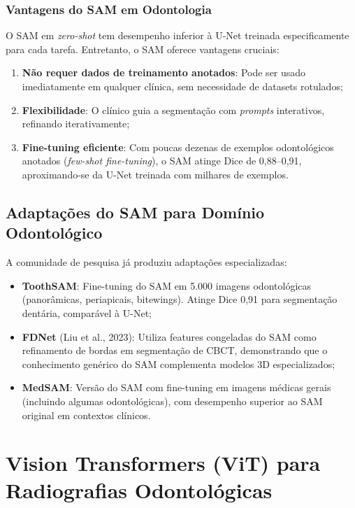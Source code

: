 \subsubsection{Vantagens do SAM em Odontologia}

O SAM em \textit{zero-shot} tem desempenho inferior à U-Net treinada especificamente para cada tarefa. Entretanto, o SAM oferece vantagens cruciais:
\begin{enumerate}
    \item \textbf{Não requer dados de treinamento anotados}: Pode ser usado imediatamente em qualquer clínica, sem necessidade de datasets rotulados;
    \item \textbf{Flexibilidade}: O clínico guia a segmentação com \textit{prompts} interativos, refinando iterativamente;
    \item \textbf{Fine-tuning eficiente}: Com poucas dezenas de exemplos odontológicos anotados (\textit{few-shot fine-tuning}), o SAM atinge Dice de 0,88--0,91, aproximando-se da U-Net treinada com milhares de exemplos.
\end{enumerate}

\subsection{Adaptações do SAM para Domínio Odontológico}

A comunidade de pesquisa já produziu adaptações especializadas:
\begin{itemize}
    \item \textbf{ToothSAM}: Fine-tuning do SAM em 5.000 imagens odontológicas (panorâmicas, periapicais, bitewings). Atinge Dice 0,91 para segmentação dentária, comparável à U-Net;
    \item \textbf{FDNet} (Liu et al., 2023): Utiliza features congeladas do SAM como refinamento de bordas em segmentação de CBCT, demonstrando que o conhecimento genérico do SAM complementa modelos 3D especializados;
    \item \textbf{MedSAM}: Versão do SAM com fine-tuning em imagens médicas gerais (incluindo algumas odontológicas), com desempenho superior ao SAM original em contextos clínicos.
\end{itemize}

\section{Vision Transformers (ViT) para Radiografias Odontológicas}

